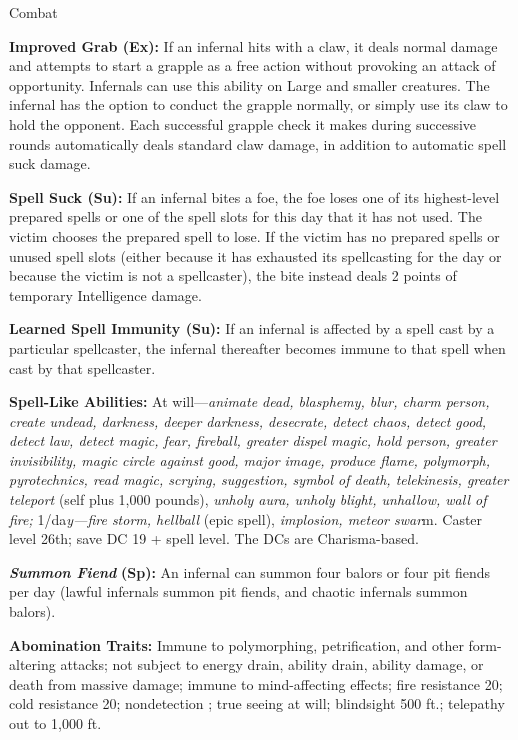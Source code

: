 \documentclass{article}
\begin{document}
Combat\textbf{ }

\textbf{Improved Grab (Ex):} If an infernal hits with a claw, it deals normal damage 
and attempts to start a grapple as a free action without provoking an attack of 
opportunity. Infernals can use this ability on Large and smaller creatures. The 
infernal has the option to conduct the grapple normally, or simply use its claw 
to hold the opponent. Each successful grapple check it makes during successive 
rounds automatically deals standard claw damage, in addition to automatic spell 
suck damage. 

\textbf{Spell Suck (Su):} If an infernal bites a foe, the foe loses one of its 
highest-level prepared spells or one of the spell slots for this day that it has 
not used. The victim chooses the prepared spell to lose. If the victim has no prepared 
spells or unused spell slots (either because it has exhausted its spellcasting 
for the day or because the victim is not a spellcaster), the bite instead deals 
2 points of temporary Intelligence damage. 

\textbf{Learned Spell Immunity (Su):} If an infernal is affected by a spell cast 
by a particular spellcaster, the infernal thereafter becomes immune to that spell 
when cast by that spellcaster. 

\textbf{Spell-Like Abilities:} At will---\textit{animate dead, blasphemy, blur, 
charm person, create undead, darkness, deeper darkness, desecrate, detect chaos, 
detect good, detect law, detect magic, fear, fireball, greater dispel magic, hold 
person, greater invisibility, magic circle against good, major image, produce flame, 
polymorph, pyrotechnics, read magic, scrying, suggestion, symbol of death, telekinesis, 
greater teleport }(self plus 1,000 pounds), \textit{unholy aura, unholy blight, 
unhallow, wall of fire; }1/da\textit{y---fire storm, hellball }(epic spell), \textit{implosion, 
meteor swar}m. Caster level 26th; save DC 19 + spell level. The DCs are Charisma-based.

\textit{\textbf{Summon Fiend }}\textbf{(Sp):} An infernal can summon four balors 
or four pit fiends per day (lawful infernals summon pit fiends, and chaotic infernals 
summon balors). 

\textbf{Abomination Traits:} Immune to polymorphing, petrification, and other form-altering 
attacks; not subject to energy drain, ability drain, ability damage, or death from 
massive damage; immune to mind-affecting effects; fire resistance 20; cold resistance 
20; nondetection ; true seeing at will; blindsight 500 ft.; telepathy out to 1,000 
ft. 
\end{document}
